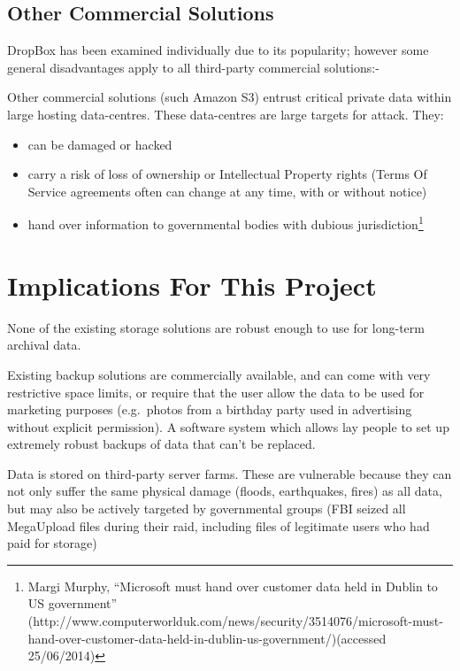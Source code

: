 \documentclass[12pt,a4paper,]{adreport}
\begin{document}
\subsection{Other Commercial
Solutions}\label{other-commercial-solutions}

DropBox has been examined individually due to its popularity; however
some general disadvantages apply to all third-party commercial
solutions:-

Other commercial solutions (such Amazon S3) entrust critical private
data within large hosting data-centres. These data-centres are large
targets for attack. They:

\begin{itemize}
\itemsep1pt\parskip0pt
\item
  can be damaged or hacked
\item
  carry a risk of loss of ownership or Intellectual Property rights
  (Terms Of Service agreements often can change at any time, with or
  without notice)
\item
  hand over information to governmental bodies with dubious
  jurisdiction\footnote{Margi Murphy, ``Microsoft must hand over
    customer data held in Dublin to US government''
    (http://www.computerworlduk.com/news/security/3514076/microsoft-must-hand-over-customer-data-held-in-dublin-us-government/)(accessed
    25/06/2014)}
\end{itemize}

\section{Implications For This
Project}\label{implications-for-this-project}

None of the existing storage solutions are robust enough to use for
long-term archival data.

Existing backup solutions are commercially available, and can come with
very restrictive space limits, or require that the user allow the data
to be used for marketing purposes (e.g.~photos from a birthday party
used in advertising without explicit permission). A software system
which allows lay people to set up extremely robust backups of data that
can't be replaced.

Data is stored on third-party server farms. These are vulnerable because
they can not only suffer the same physical damage (floods, earthquakes,
fires) as all data, but may also be actively targeted by governmental
groups (FBI seized all MegaUpload files during their raid, including
files of legitimate users who had paid for storage)
\end{document}
